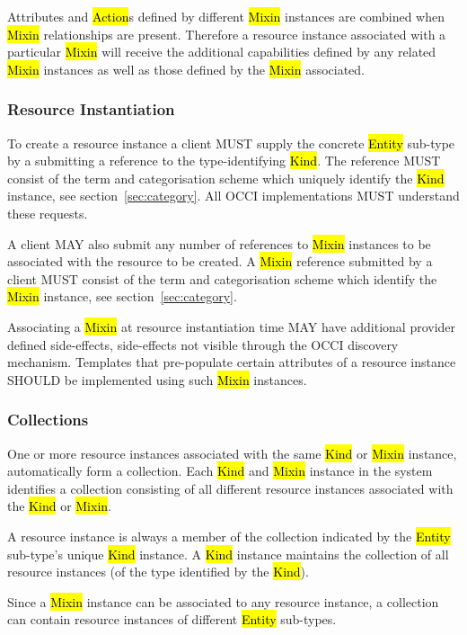 \documentclass[10pt,a4paper]{article}
\begin{document}
Attributes and \hl{Action}s defined by different \hl{Mixin} instances
are combined when \hl{Mixin} relationships are present. Therefore a
resource instance associated with a particular \hl{Mixin} will receive
the additional capabilities defined by any related \hl{Mixin}
instances as well as those defined by the \hl{Mixin} associated.

\subsubsection{Resource Instantiation}
\label{sec:instantiation}
To create a resource instance a client MUST supply the concrete
\hl{Entity} sub-type by a submitting a reference to the
type-identifying \hl{Kind}.  The reference MUST consist of the term
and categorisation scheme which uniquely identify the \hl{Kind}
instance, see section~\ref{sec:category}.  All OCCI implementations
MUST understand these requests.

A client MAY also submit any number of references to \hl{Mixin}
instances to be associated with the resource to be created. A
\hl{Mixin} reference submitted by a client MUST consist of the term
and categorisation scheme which identify the \hl{Mixin} instance, see
section~\ref{sec:category}.

Associating a \hl{Mixin} at resource instantiation time MAY have
additional provider defined side-effects, side-effects not visible
through the OCCI discovery mechanism. Templates that pre-populate
certain attributes of a resource instance SHOULD be implemented using
such \hl{Mixin} instances.

\subsubsection{Collections}
\label{sec:collection}
One or more resource instances associated with the same \hl{Kind} or
\hl{Mixin} instance, automatically form a collection.  Each \hl{Kind}
and \hl{Mixin} instance in the system identifies a collection
consisting of all different resource instances associated with the
\hl{Kind} or \hl{Mixin}.

A resource instance is always a member of the collection indicated by
the \hl{Entity} sub-type's unique \hl{Kind} instance. A \hl{Kind}
instance maintains the collection of all resource instances (of the
type identified by the \hl{Kind}).

Since a \hl{Mixin} instance can be associated to any resource
instance, a collection can contain resource instances of different
\hl{Entity} sub-types.
\end{document}
